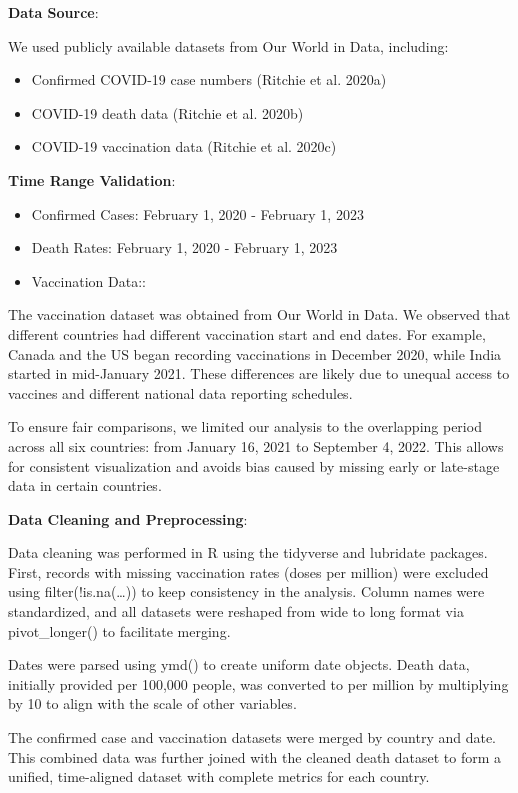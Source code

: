 \documentclass[
  11pt,
]{article}
\begin{document}
\textbf{Data Source}:

We used publicly available datasets from Our World in Data, including:

\begin{itemize}
\item
  Confirmed COVID-19 case numbers (Ritchie et al. 2020a)
\item
  COVID-19 death data (Ritchie et al. 2020b)
\item
  COVID-19 vaccination data (Ritchie et al. 2020c)
\end{itemize}

\textbf{Time Range Validation}:

\begin{itemize}
\item
  Confirmed Cases: February 1, 2020 - February 1, 2023
\item
  Death Rates: February 1, 2020 - February 1, 2023
\item
  Vaccination Data::
\end{itemize}

The vaccination dataset was obtained from Our World in Data. We observed
that different countries had different vaccination start and end dates.
For example, Canada and the US began recording vaccinations in December
2020, while India started in mid-January 2021. These differences are
likely due to unequal access to vaccines and different national data
reporting schedules.

To ensure fair comparisons, we limited our analysis to the overlapping
period across all six countries: from January 16, 2021 to September 4,
2022. This allows for consistent visualization and avoids bias caused by
missing early or late-stage data in certain countries.

\textbf{Data Cleaning and Preprocessing}:

Data cleaning was performed in R using the tidyverse and lubridate
packages. First, records with missing vaccination rates (doses per
million) were excluded using filter(!is.na(\ldots)) to keep consistency
in the analysis. Column names were standardized, and all datasets were
reshaped from wide to long format via pivot\_longer() to facilitate
merging.

Dates were parsed using ymd() to create uniform date objects. Death
data, initially provided per 100,000 people, was converted to per
million by multiplying by 10 to align with the scale of other variables.

The confirmed case and vaccination datasets were merged by country and
date. This combined data was further joined with the cleaned death
dataset to form a unified, time-aligned dataset with complete metrics
for each country.
\end{document}
